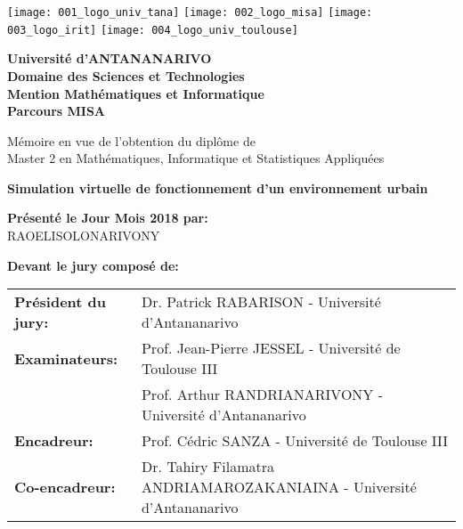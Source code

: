 \sloppy


\begin{titlepage}
	\begin{center}
	  \texttt{[image: 001\_logo\_univ\_tana]}\hspace*{4em}
	  \texttt{[image: 002\_logo\_misa]}\hspace*{4em}
	  \texttt{[image: 003\_logo\_irit]}\hspace*{4em}
	  \texttt{[image: 004\_logo\_univ\_toulouse]}
	\end{center}
	\vspace*{2em}
	
	\begin{center}
		\textbf{Université d'ANTANANARIVO} \\	
		\textbf{Domaine des Sciences et Technologies} \\
		\textbf{Mention Mathématiques et Informatique} \\	
		\textbf{Parcours MISA} \\
		\vspace*{3em}
		
		Mémoire en vue de l'obtention du diplôme de \\ 
		Master 2 en Mathématiques, Informatique et Statistiques Appliquées 
		\vspace*{3em}
		
		\begin{Large}
			\textbf{Simulation virtuelle de fonctionnement d'un environnement urbain}
		\end{Large}
		\vspace*{2em}
		
		\textbf{Présenté le Jour Mois 2018 par:} \\
		RAOELISOLONARIVONY
		\vspace*{2em}
		
		\textbf{Devant le jury composé de:}\\
		\vspace*{2em}
		\begin{tabular}{l l}
			\textbf{Président du jury:}	&	Dr. Patrick RABARISON - Université d'Antananarivo \\
			\textbf{Examinateurs:}		&	Prof. Jean-Pierre JESSEL - Université de Toulouse III \\
										&	Prof. Arthur RANDRIANARIVONY - Université d'Antananarivo \\
			\textbf{Encadreur:}			& 	Prof. Cédric SANZA	- Université de Toulouse III \\
			\textbf{Co-encadreur:}		& 	Dr. Tahiry Filamatra ANDRIAMAROZAKANIAINA - Université d'Antananarivo \\
		\end{tabular}
	\end{center}
\end{titlepage}

\restoregeometry  
